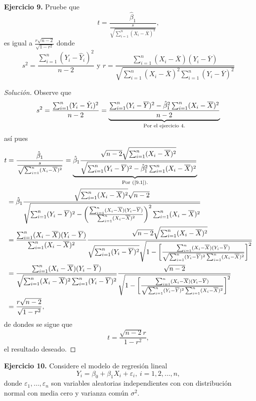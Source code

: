 \documentclass[10.5pt,notitlepage]{article}
\newenvironment{solucion}
  {\begin{proof}[Solución]}
  {\end{proof}}
\newcommand{\ee}{\varepsilon}
\newcommand{\corch}[1]{\left[ #1 \right]}
\newcommand{\pare}[1]{\left( #1 \right)}
\begin{document}
\noindent \textbf{Ejercicio 9.} Pruebe que 
\[
t =\frac{\hat{\beta}_1}{\frac{s}{\sqrt{\sum_{i = 1}^{n}(X_i - \overline{X})^2}}},
\]
es igual a \(\frac{r\sqrt{n-2}}{\sqrt{1 - r^2}}\) donde 
\[
s^2 = \frac{\sum_{i=1}^n(Y_i - \hat{Y}_i)^2}{n-2} \text{ y } r = \frac{\sum_{i=1}^{n}(X_i - \overline{X})(Y_i - \overline{Y})}{\sqrt{\sum_{i=1}^{n}(X_i - \overline{X})^2 \sum_{i=1}^{n}(Y_i - \overline{Y})^2}}
\]
\begin{solucion}
Observe que 
\begin{equation}\label{9.1}
    s^2 = \frac{\sum_{i=1}^n(Y_i - \hat{Y}_i)^2}{n-2} = \underbrace{\frac{\sum_{i=1}^{n}(Y_i - \overline{Y})^2 - \hat{\beta}_{1}^2 \sum_{i =1}^{n}(X_i - \overline{X})^2}{n-2}}_{\text{\shortstack{Por el ejercicio 4.}}}
\end{equation}
así pues 
\begin{align*}
    t &= \frac{\hat{\beta}_1}{\frac{s}{\sqrt{\sum_{i = 1}^{n}(X_i - \overline{X})^2}}} = \underbrace{\hat{\beta}_1\frac{\sqrt{n-2 }\sqrt{\sum_{i=1}^{n}(X_i -\overline{X})^2}}{\sqrt{\sum_{i=1}^{n}(Y_i - \overline{Y})^2 - \hat{\beta}_{1}^2 \sum_{i =1}^{n}(X_i - \overline{X})^2}}}_{\text{Por (\ref{9.1}).}}\nonumber\\
     &=\hat{\beta}_1\frac{\sqrt{\sum_{i=1}^{n}(X_i - \overline{X})^2} \sqrt{n-2}}{\sqrt{\sum_{i=1}^{n}(Y_i - \overline{Y})^2 - \pare{\frac{\sum_{i=1}^{n}(X_i - \overline{X})(Y_i -\overline{Y})}{\sum_{i=1}^{n}(X_i - \overline{X})^2}}^{2}\sum_{i=1}^{n}(X_i - \overline{X})^2} }\nonumber\\ 
     &= \frac{\sum_{i=1}^{n}(X_i - \overline{X})(Y_i - \overline{Y})}{\sum_{i=1}^{n}(X_i - \overline{X})^2}\frac{\sqrt{n-2}\sqrt{\sum_{i=1}^{n}(X_i - \overline{X})^2}}{\sqrt{\sum_{i=1}^{n}(Y_i - \overline{Y})^2}\sqrt{1 - \corch{\frac{\sum_{i=1}^{n}(X_i - \overline{X})(Y_i - \overline{Y})}{\sqrt{\sum_{i=1}^{n}(Y_i - \overline{Y})^2 \sum_{i=1}^{n}(X_i - \overline{X})^2}}}^2}}\nonumber\\
     &= \frac{\sum_{i=1}^{n}(X_i - \overline{X})(Y_i - \overline{Y})}{\sqrt{\sum_{i=1}^{n}(X_i - \overline{X})^2 \sum_{i=1}^{n}(Y_i - \overline{Y})^2}}\frac{\sqrt{n-2}}{\sqrt{1 - \corch{\frac{\sum_{i=1}^{n}(X_i - \overline{X})(Y_i - \overline{Y})}{\sqrt{\sum_{i=1}^{n}(Y_i - \overline{Y})^2\sum_{i=1}^{n}(X_i - \overline{X})^2}}}^2}}\nonumber\\
     &= \frac{r\sqrt{n-2}}{\sqrt{1 - r^2}},
\end{align*}
de dondes se sigue que 
\[
 t = \frac{\sqrt{n-2} r}{1 - r^2},
\]
el resultado deseado.
\end{solucion}
\noindent \textbf{Ejercicio 10.} Considere el modelo de regresión lineal 
\[
Y_i = \beta_0 + \beta_1 X_i + \ee_i,\ i =1,2,\hdots,n, 
\]
donde \(\ee_1, \hdots, \ee_n\) son variables aleatorias independientes con con distribución normal con media cero y varianza común \(\sigma^2\).\\
\end{document}
